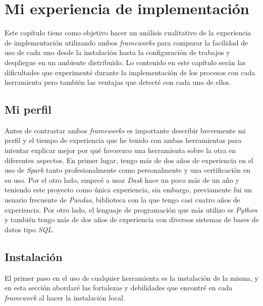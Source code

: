 \chapter{Mi experiencia de implementación}

\noindent Este capítulo tiene como objetivo hacer un análisis cualitativo de la experiencia de implementación utilizando ambos \textit{frameworks} para comparar la facilidad de uso de cada uno desde la instalación hasta la configuración de trabajos y despliegue en un ambiente distribuido. Lo contenido en este capítulo serán las dificultades que experimenté durante la implementación de los procesos con cada herramienta pero también las ventajas que detecté con cada uno de ellos.

\section{Mi perfil}

Antes de contrastar ambos \textit{frameworks} es importante describir brevemente mi perfil y el tiempo de experiencia que he tenido con ambas herramientas para intentar explicar mejor por qué favorezco una herramienta sobre la otra en diferentes aspectos. En primer lugar, tengo más de dos años de experiencia en el uso de \textit{Spark} tanto profesionalmente como personalmente y una certificación en su uso. Por el otro lado, empecé a usar \textit{Dask} hace un poco más de un año y teniendo este proyecto como única experiencia, sin embargo, previamente fui un usuario frecuente de \textit{Pandas}, biblioteca con la que tengo casi cuatro años de experiencia. Por otro lado, el lenguaje de programación que más utilizo es \textit{Python} y también tengo más de dos años de experiencia con diversos sistemas de bases de datos tipo \textit{SQL}.

\section{Instalación}

El primer paso en el uso de cualquier herramienta es la instalación de la misma, y en esta sección abordaré las fortalezas y debilidades que encontré en cada \textit{framework} al hacer la instalación local.

